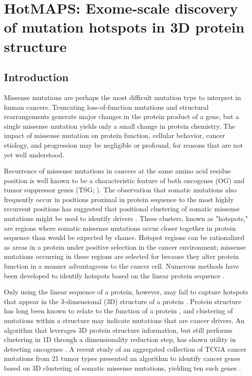 
\chapter{HotMAPS: Exome-scale discovery of mutation hotspots in 3D protein structure}
\label{chap:ch5}

\section{Introduction}

Missense mutations are perhaps the most difficult mutation type to interpret in human cancers. Truncating loss-of-function mutations and structural rearrangements generate major changes in the protein product of a gene, but a single missense mutation yields only a small change in protein chemistry. The impact of missense mutation on protein function, cellular behavior, cancer etiology, and progression may be negligible or profound, for reasons that are not yet well understood. 

Recurrence of missense mutations in cancers at the same amino acid residue position is well known to be a characteristic feature of both oncogenes (OG) and tumor suppressor genes (TSG; \cite{RN107}). The observation that somatic mutations also frequently occur in positions proximal in protein sequence to the most highly recurrent positions has suggested that positional clustering of somatic missense mutations might be used to identify drivers \cite{RN109}. These clusters, known as "hotspots," are regions where somatic missense mutations occur closer together in protein sequence than would be expected by chance. Hotspot regions can be rationalized as areas in a protein under positive selection in the cancer environment; missense mutations occurring in these regions are selected for because they alter protein function in a manner advantageous to the cancer cell. Numerous methods have been developed to identify hotspots based on the linear protein sequence \cite{RN16, RN46, RN110, RN87, RN54, RN55}.

Only using the linear sequence of a protein, however, may fail to capture hotspots that appear in the 3-dimensional (3D) structure of a protein \cite{RN105}. Protein structure has long been known to relate to the function of a protein \cite{RN112, RN113}, and clustering of mutations within a structure may indicate mutations that are cancer drivers. An algorithm that leverages 3D protein structure information, but still performs clustering in 1D through a dimensionality reduction step, has shown utility in detecting oncogenes \cite{RN15}. A recent study of an aggregated collection of TCGA cancer mutations from 21 tumor types presented an algorithm to identify cancer genes based on 3D clustering of somatic missense mutations, yielding ten such genes \cite{RN105}. 

